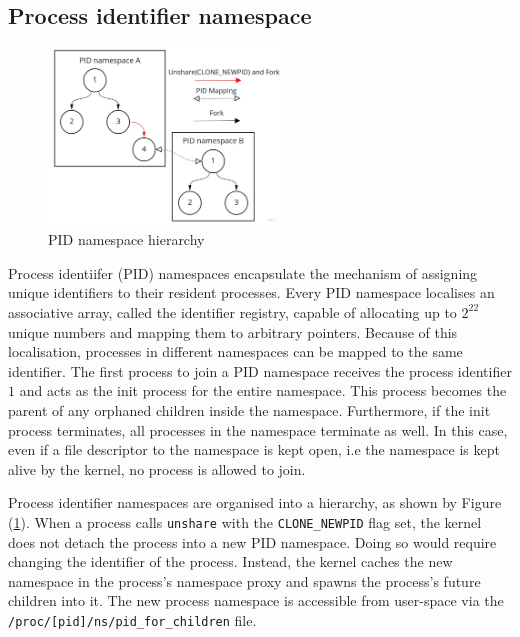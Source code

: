\subsection{Process identifier namespace}
\label{sections:fundamentals/namespaces/process}
\begin{figure}[H]
    \centering
    \includegraphics[width=0.55\textwidth]{images/fundamentals/pid-namespace-hierarchy.jpg}
    \caption{PID namespace hierarchy}
    \label{images:fundamentals/pid-namespace-hierarchy.jpg}
\end{figure}
Process identiifer (PID) namespaces encapsulate the mechanism of assigning 
unique identifiers to their resident processes. Every PID namespace localises an associative 
array, called the identifier registry, capable of allocating up to $2^{22}$ unique numbers and mapping them to arbitrary 
pointers. Because of this localisation, processes in different namespaces can be mapped to the 
same identifier. The first process to join a PID namespace receives the process identifier $1$ 
and acts as the init process for the entire namespace. This process becomes the parent of 
any orphaned children inside the namespace. Furthermore, if the init process terminates, all processes 
in the namespace terminate as well. In this case, even if a file descriptor to the namespace is kept open, 
i.e the namespace is kept alive by the kernel, no process is allowed to join.  

Process identifier namespaces are organised into a hierarchy, 
as shown by Figure (\ref{images:fundamentals/pid-namespace-hierarchy.jpg}).
When a process calls \verb|unshare| with the \verb|CLONE_NEWPID| flag set, 
the kernel does not detach the process into a new PID namespace. Doing so would require 
changing the identifier of the process.
Instead, the kernel caches the new namespace in the process's namespace proxy and 
spawns the process's future children into it. The new process namespace is accessible from 
user-space via the \verb|/proc/[pid]/ns/pid_for_children| file. 

